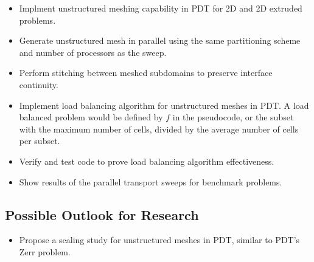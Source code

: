 \documentclass[11pt, letterpaper,titlepage,oneside]{article}
\begin{document}
\begin{itemize}
\item Implment unstructured meshing capability in PDT for 2D and 2D extruded problems.
\item Generate unstructured mesh in parallel using the same partitioning scheme and number of processors as the sweep.
\item {Perform stitching between meshed subdomains to preserve interface continuity.}

\item Implement load balancing algorithm for unstructured meshes in PDT. A load balanced problem would be defined by $f$ in the pseudocode, or the subset with the maximum number of cells, divided by the average number of cells per subset.
\item Verify and test code to prove load balancing algorithm effectiveness. 
\item Show results of the parallel transport sweeps for benchmark problems.
\end{itemize}
\subsection{Possible Outlook for Research}
\begin{itemize}
\item Propose a scaling study for unstructured meshes in PDT, similar to PDT's Zerr problem.
\end{itemize}



\end{document}
